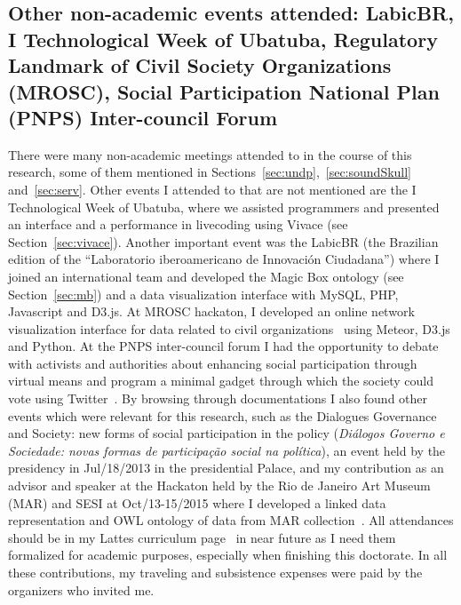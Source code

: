 \begin{apendicesenv}
\section{Other non-academic events attended: LabicBR, I Technological Week of Ubatuba, Regulatory Landmark of Civil Society Organizations (MROSC), Social Participation National Plan (PNPS) Inter-council Forum}\label{sec:ona}
There were many non-academic meetings attended to in the course of this research,
some of them mentioned in Sections~\ref{sec:undp},~\ref{sec:soundSkull} and~\ref{sec:serv}.
Other events I attended to that are not mentioned are the I Technological Week of Ubatuba, where
we assisted programmers and presented an interface and a performance in livecoding using Vivace (see Section~\ref{sec:vivace}).
Another important event was the LabicBR (the Brazilian edition of the ``Laboratorio iberoamericano de Innovación Ciudadana'')
where I joined an international team and developed the Magic Box ontology (see Section~\ref{sec:mb}) and a data visualization interface
with MySQL, PHP, Javascript and D3.js.
At MROSC hackaton, I developed an online network visualization interface for data related to civil organizations~\cite{oscEmRede} using
Meteor, D3.js and Python.
At the PNPS inter-council forum I had the opportunity to debate with activists and authorities about enhancing social participation
through virtual means and program a minimal gadget through which the society could vote using Twitter~\cite{votoTwitter}.
By browsing through documentations I also found other events which were relevant for this research,
such as the
Dialogues Governance and Society: new forms of social participation in the policy
(\emph{Diálogos Governo e Sociedade: novas formas de participação social na política}),
an event held by the presidency in Jul/18/2013 in the presidential Palace,
and my contribution as an advisor and speaker at the Hackaton held by the Rio de Janeiro Art Museum (MAR)
and SESI at Oct/13-15/2015 where I developed a linked data representation and OWL ontology of data from MAR collection~\cite{hackmar}.
All attendances should be in my Lattes curriculum page~\cite{myLattes} in near future as
I need them formalized for academic purposes, especially when finishing this doctorate.
In all these contributions, my traveling and subsistence expenses were paid by the organizers who invited me.


\end{apendicesenv}
